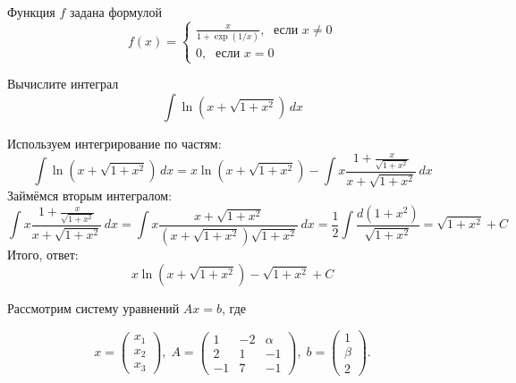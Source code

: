 \documentclass[addpoints]{exam} %
\begin{document}
\begin{questions}

\question Функция $f$ задана формулой 
\[
f(x)=\begin{cases}
\frac{x}{1+\exp(1/x)}, \; \text{ если } x\neq 0 \\
0, \; \text{ если } x = 0
\end{cases}
\]

\question[10] Вычислите интеграл
\[
\int  \ln (x + \sqrt{1+x^2}) \, dx
\]

\begin{solution}
Используем интегрирование по частям:
\[
\int \ln (x + \sqrt{1+x^2}) \, dx = x \ln (x + \sqrt{1+x^2}) - \int x \frac{1+\frac{x}{\sqrt{1+x^2}}}{x + \sqrt{1+x^2}} \, dx 
\]
Займёмся вторым интегралом:
\[
\int x \frac{1+\frac{x}{\sqrt{1+x^2}}}{x + \sqrt{1+x^2}} \, dx =\int x \frac{x+\sqrt{1+x^2}}{(x + \sqrt{1+x^2})\sqrt{1+x^2}} \, dx =
\frac{1}{2}\int  \frac{d(1+x^2)}{\sqrt{1+x^2}} = \sqrt{1+x^2} + C
\]
Итого, ответ:
\[
x \ln (x + \sqrt{1+x^2}) - \sqrt{1+x^2} + C
\]

\end{solution}

\question Рассмотрим систему уравнений $Ax=b$, где 

\[
x=\begin{pmatrix}
x_1 \\
x_2 \\
x_3 
\end{pmatrix}, \; 
A=\begin{pmatrix}
1 & -2 & \alpha \\
2 & 1 &  -1\\
-1 & 7 & -1  
\end{pmatrix}, \;
b=\begin{pmatrix}
1 \\
\beta \\
2
\end{pmatrix}.
\]


\end{questions}
\end{document}
